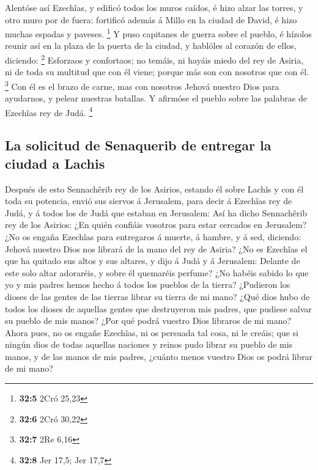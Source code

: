  Alentóse así Ezechîas, y edificó todos los muros caídos, é
hizo alzar las torres, y otro muro por de fuera: fortificó además á
Millo en la ciudad de David, é hizo muchas espadas y paveses.
\footnote{\textbf{32:5} 2Cró 25,23}  Y puso capitanes de
guerra sobre el pueblo, é hízolos reunir así en la plaza de la puerta de
la ciudad, y hablóles al corazón de ellos, diciendo: \footnote{\textbf{32:6}
  2Cró 30,22}  Esforzaos y confortaos; no temáis, ni hayáis
miedo del rey de Asiria, ni de toda su multitud que con él viene; porque
más son con nosotros que con él. \footnote{\textbf{32:7} 2Re 6,16}
 Con él es el brazo de carne, mas con nosotros Jehová
nuestro Dios para ayudarnos, y pelear nuestras batallas. Y afirmóse el
pueblo sobre las palabras de Ezechîas rey de Judá. \footnote{\textbf{32:8}
  Jer 17,5; Jer 17,7}

\hypertarget{la-solicitud-de-senaquerib-de-entregar-la-ciudad-a-lachis}{%
\subsection{La solicitud de Senaquerib de entregar la ciudad a
Lachis}\label{la-solicitud-de-senaquerib-de-entregar-la-ciudad-a-lachis}}

 Después de esto Sennachêrib rey de los Asirios, estando él
sobre Lachîs y con él toda su potencia, envió sus siervos á Jerusalem,
para decir á Ezechîas rey de Judá, y á todos los de Judá que estaban en
Jerusalem:  Así ha dicho Sennachêrib rey de los Asirios:
¿En quién confiáis vosotros para estar cercados en Jerusalem?
 ¿No os engaña Ezechîas para entregaros á muerte, á hambre,
y á sed, diciendo: Jehová nuestro Dios nos librará de la mano del rey de
Asiria?  ¿No es Ezechîas el que ha quitado sus altos y sus
altares, y dijo á Judá y á Jerusalem: Delante de este solo altar
adoraréis, y sobre él quemaréis perfume?  ¿No habéis sabido
lo que yo y mis padres hemos hecho á todos los pueblos de la tierra?
¿Pudieron los dioses de las gentes de las tierras librar su tierra de mi
mano?  ¿Qué dios hubo de todos los dioses de aquellas
gentes que destruyeron mis padres, que pudiese salvar su pueblo de mis
manos? ¿Por qué podrá vuestro Dios libraros de mi mano? 
Ahora pues, no os engañe Ezechîas, ni os persuada tal cosa, ni le
creáis; que si ningún dios de todas aquellas naciones y reinos pudo
librar su pueblo de mis manos, y de las manos de mis padres, ¿cuánto
menos vuestro Dios os podrá librar de mi mano?

